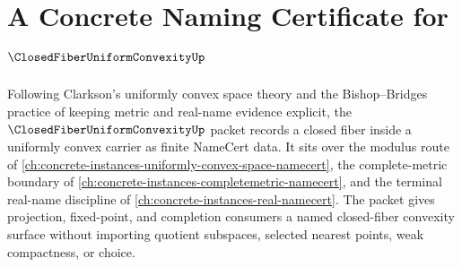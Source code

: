 \chapter{A Concrete Naming Certificate for $\ClosedFiberUniformConvexityUp$}
\label{ch:concrete-instances-closed-fiber-uniform-convexity-namecert}

Following Clarkson's uniformly convex space theory and the Bishop--Bridges practice of keeping metric and real-name evidence explicit, the $\ClosedFiberUniformConvexityUp$ packet records a closed fiber inside a uniformly convex carrier as finite NameCert data. It sits over the modulus route of \autoref{ch:concrete-instances-uniformly-convex-space-namecert}, the complete-metric boundary of \autoref{ch:concrete-instances-completemetric-namecert}, and the terminal real-name discipline of \autoref{ch:concrete-instances-real-namecert}. The packet gives projection, fixed-point, and completion consumers a named closed-fiber convexity surface without importing quotient subspaces, selected nearest points, weak compactness, or choice.

